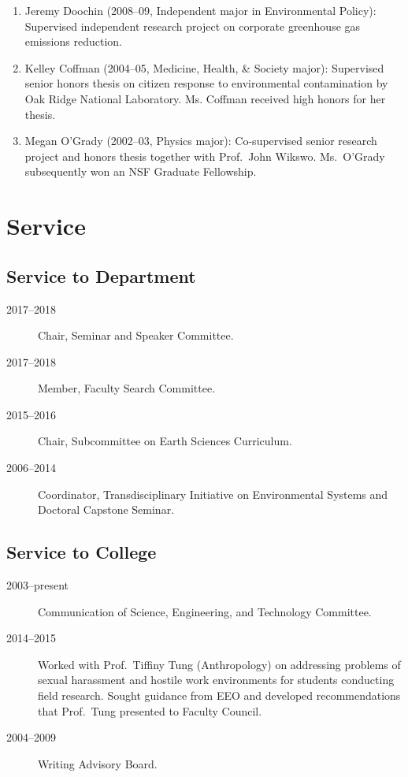 \documentclass[10pt]{article}
\begin{document}
\begin{enumerate}
    \item Jeremy Doochin (2008--09, Independent major in Environmental Policy): Supervised independent research project on corporate greenhouse gas emissions reduction.
	\item Kelley Coffman (2004--05, Medicine, Health, \& Society major): Supervised senior honors thesis on citizen response to environmental contamination by Oak Ridge National Laboratory. Ms. Coffman received high honors for her thesis.
	\item Megan O'Grady (2002--03, Physics major): Co-supervised senior research project and honors thesis together with Prof.~John Wikswo. Ms.~O'Grady subsequently won an NSF Graduate Fellowship.
	\end{enumerate}

\section{Service}
	\subsection{Service to Department}
    	\begin{description}
            \item[2017--2018] Chair, Seminar and Speaker Committee.
            \item[2017--2018] Member, Faculty Search Committee.
        	\item[2015--2016] Chair, Subcommittee on Earth Sciences Curriculum.
    		\item[2006--2014] Coordinator, Transdisciplinary Initiative on Environmental Systems and Doctoral Capstone Seminar.
    	\end{description}

	\subsection{Service to College}
    	\begin{description}
    		\item[2003--present] Communication of Science, Engineering, and Technology Committee.
    	    \item[2014--2015] Worked with Prof.\ Tiffiny Tung (Anthropology) on addressing problems of sexual harassment and hostile work environments for students conducting field research. Sought guidance from EEO and developed recommendations that Prof.\ Tung presented to Faculty Council.
    		\item[2004--2009] Writing Advisory Board.
    	\end{description}
\end{document}
